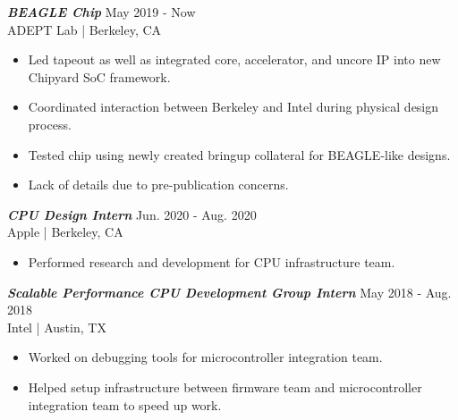 \documentclass[letter]{res}
\begin{document}
\begin{resume}
\vspace{-2mm}

{\sl \textbf{BEAGLE Chip}} \hfill May 2019 - Now\\
ADEPT Lab | Berkeley, CA \newline

 \vspace{-4mm}

 \begin{itemize}
 \item Led tapeout as well as integrated core, accelerator, and uncore IP into new Chipyard SoC framework.
 \item Coordinated interaction between Berkeley and Intel during physical design process.
 \item Tested chip using newly created bringup collateral for BEAGLE-like designs.
 \item Lack of details due to pre-publication concerns.
 \end{itemize}

\vspace{-2mm}

{\sl \textbf{CPU Design Intern}} \hfill Jun. 2020 - Aug. 2020\\
Apple | Berkeley, CA \newline

 \vspace{-4mm}

 \begin{itemize}
 \item Performed research and development for CPU infrastructure team.
 \end{itemize}

\vspace{-2mm}

{\sl \textbf{Scalable Performance CPU Development Group Intern}} \hfill May 2018 - Aug. 2018\\
Intel | Austin, TX \newline

 \vspace{-4mm}

 \begin{itemize}
 \item Worked on debugging tools for microcontroller integration team.
 \item Helped setup infrastructure between firmware team and microcontroller integration team to speed up work.
 \end{itemize}

\vspace{-2mm}


\end{resume}
\end{document}
